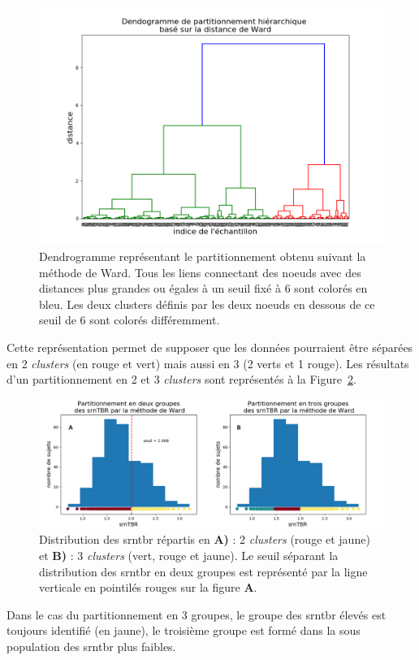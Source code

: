 \begin{figure}[h!]
  \centering
	\includegraphics[width=0.5\linewidth]{figures/chapter-4/tbr-dendrogram-ward} 
  \caption{Dendrogramme représentant le partitionnement obtenu suivant la méthode de Ward. Tous les liens connectant des noeuds avec des distances plus 
	grandes ou égales à un seuil fixé à 6 sont colorés en bleu. Les deux clusters définis par les deux noeuds en dessous de ce seuil de 6 sont colorés différemment.}
  \label{Figure:tbr_ward_dendrogram}
\end{figure}

Cette représentation permet de supposer que les données pourraient être séparées en 2 \textit{clusters} (en rouge et vert) 
mais aussi en 3 (2 verts et 1 rouge). Les résultats d'un partitionnement en 2 et 3 \textit{clusters} sont représentés à la Figure~\ref{Figure:tbr_ward_histograms}.

\begin{figure}[h!]
  \centering
	\includegraphics[width=1.0\linewidth]{figures/chapter-4/tbr-histogram-ward} 
  \caption{Distribution des \gls{srntbr} répartis en \textbf{A)} : 2 \textit{clusters} (rouge et jaune) et \textbf{B)} : 3 \textit{clusters} 
	(vert, rouge et jaune). Le seuil séparant la distribution des \gls{srntbr} en deux groupes est représenté par la ligne verticale en pointilés rouges sur la 
	figure \textbf{A}.}
  \label{Figure:tbr_ward_histograms}
\end{figure}

Dans le cas du partitionnement en 3 groupes, le groupe des \gls{srntbr} élevés est toujours identifié (en jaune), le troisième groupe est formé dans 
la sous population des \gls{srntbr} plus faibles. 

